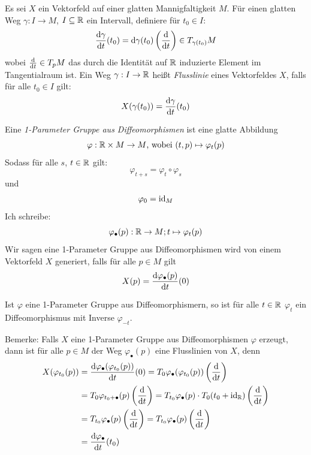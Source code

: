 \begin{definition}
    Es sei $X$ ein Vektorfeld auf einer glatten Mannigfaltigkeit $M$. Für einen
    glatten Weg $\gamma: I \to M$, $I \subseteq \R$ ein Intervall, 
    definiere für $t_0 \in I$:
    \[ \derive[\gamma]{t}(t_0) = \opd \gamma (t_0) \left(\derive{t}\right) \in T_{\gamma(t_0)}M \]
    wobei $\derive{t} \in T_pM$ das durch die Identität auf $\R$
    induzierte Element im Tangentialraum ist.
    Ein Weg $\gamma: I \to \R$ heißt \textit{Flusslinie} eines Vektorfeldes $X$,
    falls für alle $t_0 \in I$ gilt:
    \[ X(\gamma(t_0)) = \derive[\gamma]{t}(t_0) \]
\end{definition}

\begin{definition}
    Eine \textit{1-Parameter Gruppe aus Diffeomorphismen} ist eine glatte 
    Abbildung
    \[ \varphi: \R \times M \to M \text{, wobei } (t, p) \mapsto \varphi_t(p) \]
    Sodass für alle $s$, $t \in \R$ gilt:
    \[ \varphi_{t + s} = \varphi_t \circ \varphi_s \]
    und 
    \[ \varphi_0 = \id_M \]
    Ich schreibe:
    \[ \varphi_{\bullet}(p): \R \to M ; t \mapsto \varphi_t(p) \]
    Wir sagen eine 1-Parameter Gruppe aus Diffeomorphismen wird von einem
    Vektorfeld $X$ generiert, falls für alle $p \in M$ gilt
    \[ X(p) = \derive[\varphi_{\bullet}(p)]{t}(0) \]
\end{definition}

Ist $\varphi$ eine 1-Parameter Gruppe aus Diffeomorphismern, so ist für alle 
$t \in \R$ $\varphi_t$ ein Diffeomorphismus mit Inverse $\varphi_{-t}$.

Bemerke: Falls $X$ eine 1-Parameter Gruppe aus Diffeomorphismen $\varphi$ erzeugt,
dann ist für alle $p \in M$ der Weg $\varphi_{\bullet}(p)$ eine Flusslinien von $X$, denn
\begin{align*}
    X(\varphi_{t_0}(p)) 
    & = \derive[\varphi_{\bullet}(\varphi_{t_0}(p))]{t}(0)
    = T_0 \varphi_{\bullet}(\varphi_{t_0}(p)) \left(\derive{t}\right) \\
    & = T_0 \varphi_{t_0 + \bullet}(p) \left(\derive{t}\right)
    = T_{t_0} \varphi_{\bullet}(p) \cdot T_0 (t_0 + \id_{\R}) \left(\derive{t}\right) \\
    & = T_{t_0} \varphi_{\bullet}(p) \left(\derive{t}\right)
    = T_{t_0} \varphi_{\bullet}(p) \left(\derive{t}\right) \\
    & = \derive[\varphi_{\bullet}]{t}(t_0)
\end{align*}

